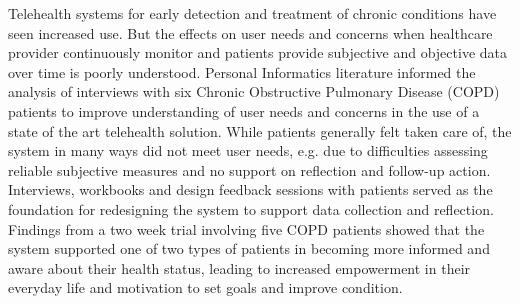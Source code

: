 Telehealth systems for early detection and treatment of chronic conditions have seen increased use. But the effects on user needs and concerns when healthcare provider continuously monitor and patients provide subjective and objective data over time is poorly understood. Personal Informatics literature informed the analysis of interviews with six Chronic Obstructive Pulmonary Disease (COPD) patients to improve understanding of user needs and concerns in the use of a state of the art telehealth solution. While patients generally felt taken care of, the system in many ways did not meet user needs, e.g. due to difficulties assessing reliable subjective measures and no support on reflection and follow-up action. Interviews, workbooks and design feedback sessions with patients served as the foundation for redesigning the system to support data collection and reflection. Findings from a two week trial involving five COPD patients showed that the system supported one of two types of patients in becoming more informed and aware about their health status, leading to increased empowerment in their everyday life and motivation to set goals and improve condition.